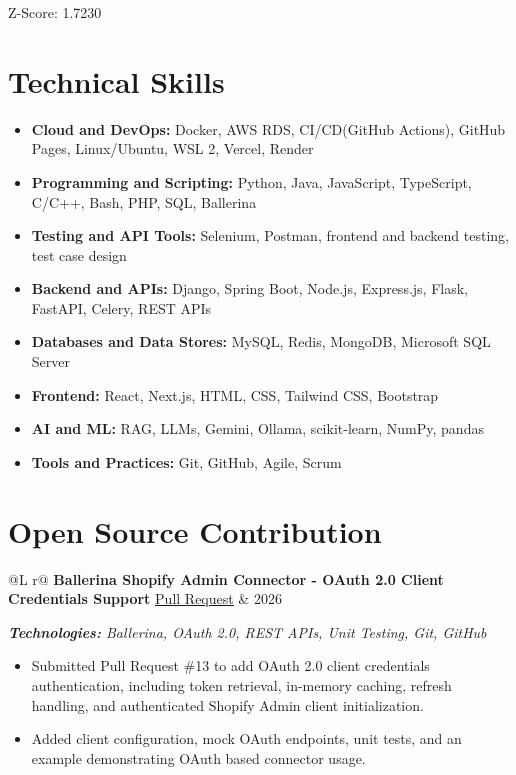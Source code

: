 \documentclass[10pt,a4paper]{article}
\makeatletter
\newcommand{\prlink}[1]{%
    \href{#1}{\underline{Pull Request}}
}
\newenvironment{cvproject}[4]{%
    \par\noindent
    \begin{tabularx}{\linewidth}{@{}L r@{}}
        \textbf{#1}\quad #2 & #4 \\
    \end{tabularx}\par

    \textit{\textbf{Technologies:} #3}\par
    \nopagebreak

    \begin{itemize}[
        leftmargin=13pt,
        itemsep=0.4pt,
        topsep=0.5pt,
        parsep=0pt,
        partopsep=0pt
    ]
}{%
    \end{itemize}
    \par\vspace{5pt}
}
\makeatother
\begin{document}
Z-Score: 1.7230

\section{Technical Skills}

\begin{itemize}

    \item \textbf{Cloud and DevOps:}
    Docker, AWS RDS, CI/CD(GitHub Actions), GitHub Pages,
    Linux/Ubuntu, WSL 2, Vercel, Render

    \item \textbf{Programming and Scripting:}
    Python, Java, JavaScript, TypeScript, C/C++,
    Bash, PHP, SQL, Ballerina

    \item \textbf{Testing and API Tools:}
    Selenium, Postman, frontend and backend testing,
    test case design

    \item \textbf{Backend and APIs:}
    Django, Spring Boot, Node.js, Express.js, Flask,
    FastAPI, Celery, REST APIs

    \item \textbf{Databases and Data Stores:}
    MySQL, Redis, MongoDB, Microsoft SQL Server

    \item \textbf{Frontend:}
    React, Next.js, HTML, CSS, Tailwind CSS, Bootstrap

    \item \textbf{AI and ML:}
    RAG, LLMs, Gemini, Ollama, scikit-learn, NumPy, pandas

    \item \textbf{Tools and Practices:}
    Git, GitHub, Agile, Scrum

\end{itemize}

\section{Open Source Contribution}

\begin{cvproject}
    {Ballerina Shopify Admin Connector - OAuth 2.0 Client Credentials Support}
    {\prlink{https://github.com/ballerina-platform/module-ballerinax-shopify.admin/pull/13}}
    {Ballerina, OAuth 2.0, REST APIs, Unit Testing, Git, GitHub}
    {2026}

    \item Submitted Pull Request \#13 to add OAuth 2.0 client credentials
    authentication, including token retrieval, in-memory caching, refresh
    handling, and authenticated Shopify Admin client initialization.

    \item Added client configuration, mock OAuth endpoints, unit tests,
    and an example demonstrating OAuth based connector usage.

\end{cvproject}
\end{document}
